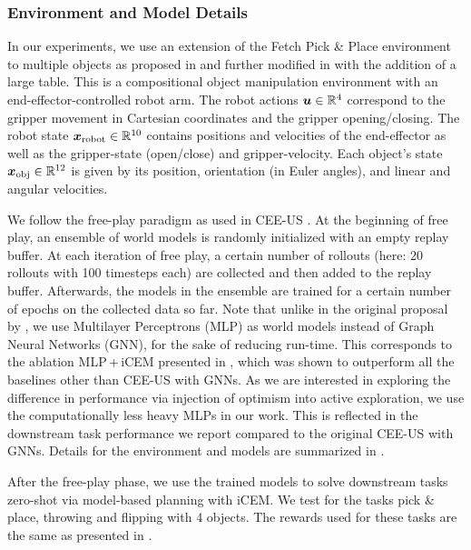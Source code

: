 \subsubsection{Environment and Model Details}
In our experiments, we use an extension of the Fetch Pick \& Place environment to multiple objects as proposed in \cite{li2020towards} and further modified in \cite{Sancaktaretal22} with the addition of a large table. This is a compositional object manipulation environment with an end-effector-controlled robot arm.
The robot actions ${\bm{u}} \in \mathbb{R}^4$ correspond to the gripper movement in Cartesian coordinates and the gripper opening/closing. The robot state ${\bm{x}}_{\text{robot}} \in \mathbb{R}^{10}$ contains positions and velocities of the end-effector as well as the gripper-state (open/close) and gripper-velocity.
Each object's state ${\bm{x}}_{\text{obj}} \in \mathbb{R}^{12}$ is given by its position, orientation (in Euler angles), and linear and angular velocities.

We follow the free-play paradigm as used in CEE-US \citep{Sancaktaretal22}. At the beginning of free play, an ensemble of world models is randomly initialized with an empty replay buffer. At each iteration of free play, a certain number of rollouts (here: 20 rollouts with 100 timesteps each) are collected and then added to the replay buffer. Afterwards, the models in the ensemble are trained for a certain number of epochs on the collected data so far. Note that unlike in the original proposal by \citet{Sancaktaretal22}, we use Multilayer Perceptrons (MLP) as world models instead of Graph Neural Networks (GNN), for the sake of reducing run-time. This corresponds to the ablation \mbox{MLP\,+\,iCEM} presented in \cite{Sancaktaretal22}, which was shown to outperform all the baselines other than CEE-US with GNNs. As we are interested in exploring the difference in performance via injection of optimism into active exploration, we use the computationally less heavy MLPs in our work. This is reflected in the downstream task performance we report compared to the original CEE-US with GNNs. Details for the environment and models are summarized in .

After the free-play phase, we use the trained models to solve downstream tasks zero-shot via model-based planning with iCEM. We test for the tasks pick \& place, throwing and flipping with 4 objects. The rewards used for these tasks are the same as presented in \cite{Sancaktaretal22}.

